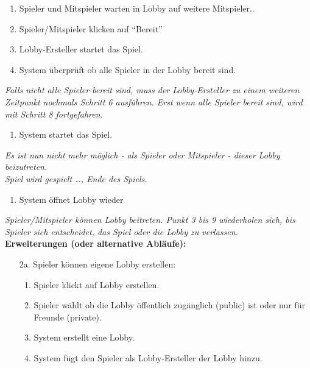 \documentclass[11pt,ngerman]{article}
\newcommand{\quotes}[1]{``#1''}
\begin{document}
\begin{tcolorbox}[breakable,sharp corners,colback=white,colframe=gray,width=\dimexpr\textwidth-15mm\relax,enlarge left by=10mm,fontupper=\linespread{1.1}\selectfont]
\begin{enumerate}
                    \item Spieler und Mitspieler warten in Lobby auf weitere Mitspieler..
                    \item Spieler/Mitspieler klicken auf \quotes{Bereit}
                    \item Lobby-Ersteller startet das Spiel.
                    \item System überprüft ob alle Spieler in der Lobby bereit sind.
                \end{enumerate}
                \textit{Falls nicht alle Spieler bereit sind, muss der Lobby-Ersteller zu einem weiteren Zeitpunkt nochmals Schritt 6 ausführen. Erst wenn alle Spieler bereit sind, wird mit Schritt 8 fortgefahren.}
                \begin{enumerate}[resume]
                    \item System startet das Spiel.
                \end{enumerate}
                \textit{Es ist nun nicht mehr möglich - als Spieler oder Mitspieler - dieser Lobby beizutreten.} \\
                \textit{Spiel wird gespielt …, Ende des Spiels.}
                \begin{enumerate}[resume]
                    \item System öffnet Lobby wieder
                \end{enumerate}
                \textit{Spieler/Mitspieler können Lobby beitreten. Punkt 3 bis 9 wiederholen sich, bis Spieler sich entscheidet, das Spiel oder die Lobby zu verlassen.} \\
                \textbf{Erweiterungen (oder alternative Abläufe):}
                \begin{itemize}
                    \item[2a.] Spieler können eigene Lobby erstellen:
                        \begin{enumerate}
                            \item Spieler klickt auf Lobby erstellen.
                            \item Spieler wählt ob die Lobby öffentlich zugänglich (public) ist oder nur für Freunde (private).
                            \item System erstellt eine Lobby.
                            \item System fügt den Spieler als Lobby-Ersteller der Lobby hinzu.
                        \end{enumerate}

\end{itemize}
\end{tcolorbox}
\end{document}
